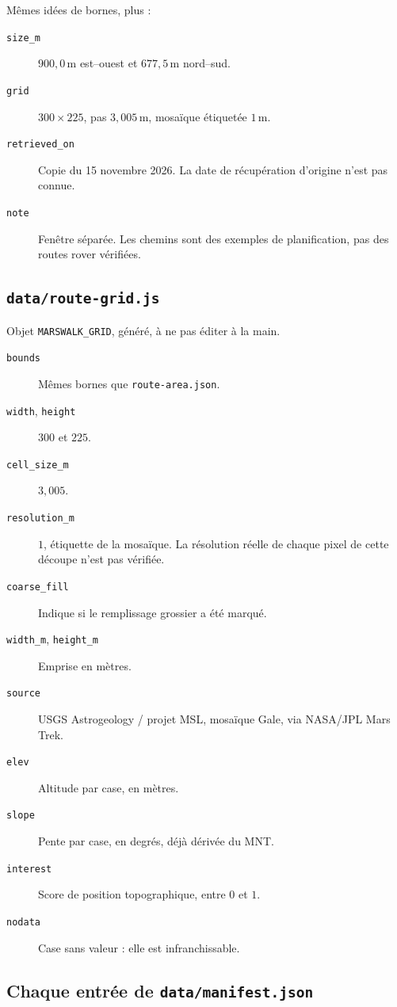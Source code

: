 \documentclass[11pt,a4paper]{article}
\begin{document}
Mêmes idées de bornes, plus :
\begin{description}
\item[\texttt{size\_m}] \(900{,}0\,\mathrm{m}\) est--ouest et \(677{,}5\,\mathrm{m}\) nord--sud.
\item[\texttt{grid}] \(300\times 225\), pas \(3{,}005\,\mathrm{m}\), mosaïque étiquetée \(1\,\mathrm{m}\).
\item[\texttt{retrieved\_on}] Copie du 15 novembre 2026. La date de récupération d'origine n'est pas connue.
\item[\texttt{note}] Fenêtre séparée. Les chemins sont des exemples de planification, pas des routes rover vérifiées.
\end{description}

\subsection{\texttt{data/route-grid.js}}

Objet \texttt{MARSWALK\_GRID}, généré, à ne pas éditer à la main.
\begin{description}
\item[\texttt{bounds}] Mêmes bornes que \texttt{route-area.json}.
\item[\texttt{width}, \texttt{height}] \(300\) et \(225\).
\item[\texttt{cell\_size\_m}] \(3{,}005\).
\item[\texttt{resolution\_m}] \(1\), étiquette de la mosaïque. La résolution réelle de chaque pixel de cette découpe n'est pas vérifiée.
\item[\texttt{coarse\_fill}] Indique si le remplissage grossier a été marqué.
\item[\texttt{width\_m}, \texttt{height\_m}] Emprise en mètres.
\item[\texttt{source}] USGS Astrogeology / projet MSL, mosaïque Gale, via NASA/JPL Mars Trek.
\item[\texttt{elev}] Altitude par case, en mètres.
\item[\texttt{slope}] Pente par case, en degrés, déjà dérivée du MNT.
\item[\texttt{interest}] Score de position topographique, entre \(0\) et \(1\).
\item[\texttt{nodata}] Case sans valeur : elle est infranchissable.
\end{description}

\subsection{Chaque entrée de \texttt{data/manifest.json}}
\end{document}
